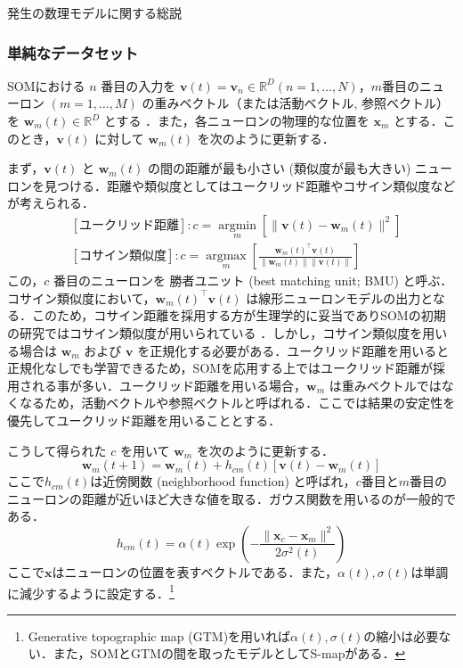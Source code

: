 \documentclass[titlepage]{ltjsbook}
\begin{document}
発生の数理モデルに関する総説 \citep{Van_Ooyen2011-fz, Goodhill2018-ho}

\subsubsection{単純なデータセット}
SOMにおける $n$ 番目の入力を $\mathbf{v}(t)=\mathbf{v}_n\in \mathbb{R}^{D} (n=1, \ldots, N)$，$m$番目のニューロン $(m=1, \ldots, M)$ の重みベクトル（または活動ベクトル, 参照ベクトル）を $\mathbf{w}_m(t)\in \mathbb{R}^{D}$ とする \citep{Kohonen2013-yt}．また，各ニューロンの物理的な位置を $\mathbf{x}_m$ とする．このとき，$\mathbf{v}(t)$ に対して $\mathbf{w}_m(t)$ を次のように更新する．

まず，$\mathbf{v}(t)$ と $\mathbf{w}_m(t)$ の間の距離が最も小さい (類似度が最も大きい) ニューロンを見つける．距離や類似度としてはユークリッド距離やコサイン類似度などが考えられる．
\begin{align}
&[\text{ユークリッド距離}]: c = \underset{m}{\operatorname{argmin}}\left[\|\mathbf{v}(t)-\mathbf{w}_m(t)\|^2\right]\\
&[\text{コサイン類似度}]: c  = \underset{m}{\operatorname{argmax}}\left[\frac{\mathbf{w}_m(t)^\top\mathbf{v}(t)}{\|\mathbf{w}_m(t)\|\|\mathbf{v}(t)\|}\right]
\end{align}
この，$c$ 番目のニューロンを 勝者ユニット (best matching unit; BMU) と呼ぶ．コサイン類似度において，$\mathbf{w}_m(t)^\top\mathbf{v}(t)$ は線形ニューロンモデルの出力となる．このため，コサイン距離を採用する方が生理学的に妥当でありSOMの初期の研究ではコサイン類似度が用いられている \citep{Kohonen1982-mn}．しかし，コサイン類似度を用いる場合は $\mathbf{w}_m$ および $\mathbf{v}$ を正規化する必要がある．ユークリッド距離を用いると正規化なしでも学習できるため，SOMを応用する上ではユークリッド距離が採用される事が多い．ユークリッド距離を用いる場合，$\mathbf{w}_m$ は重みベクトルではなくなるため，活動ベクトルや参照ベクトルと呼ばれる．ここでは結果の安定性を優先してユークリッド距離を用いることとする．

こうして得られた $c$ を用いて $\mathbf{w}_m$ を次のように更新する．
\begin{equation}
\mathbf{w}_m(t+1)=\mathbf{w}_m(t)+h_{cm}(t)[\mathbf{v}(t)-\mathbf{w}_m(t)]
\end{equation}
ここで$h_{cm}(t)$は近傍関数 (neighborhood function) と呼ばれ，$c$番目と$m$番目のニューロンの距離が近いほど大きな値を取る．ガウス関数を用いるのが一般的である．
\begin{equation}
h_{cm}(t)=\alpha(t)\exp\left(-\frac{\|\mathbf{x}_c-\mathbf{x}_m\|^2}{2\sigma^2(t)}\right)
\end{equation}
ここで$\mathbf{x}$はニューロンの位置を表すベクトルである．また，$\alpha(t), \sigma(t)$は単調に減少するように設定する．\footnote{Generative topographic map (GTM)を用いれば$\alpha(t), \sigma(t)$の縮小は必要ない．また，SOMとGTMの間を取ったモデルとしてS-mapがある．}

\printbibliography[segment=\therefsegment,heading=subbibliography,title={参考文献}]
\end{document}
